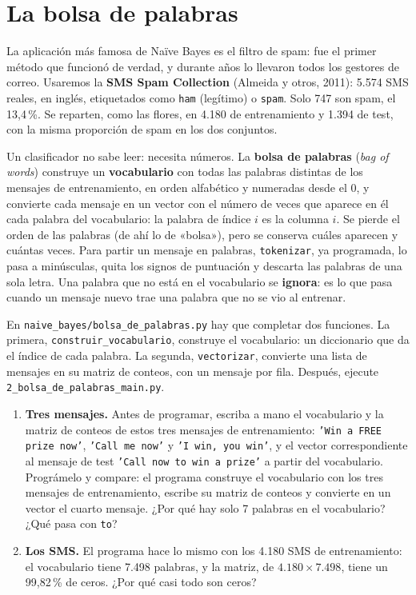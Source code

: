 \documentclass{article}
\begin{document}
\section{La bolsa de palabras}
La aplicación más famosa de Naïve Bayes es el filtro de spam: fue el primer método que funcionó de verdad, y durante años lo llevaron todos los gestores de correo. Usaremos la \textbf{SMS Spam Collection} (Almeida y otros, 2011): 5.574 SMS reales, en inglés, etiquetados como \texttt{ham} (legítimo) o \texttt{spam}. Solo 747 son spam, el 13,4\,\%. Se reparten, como las flores, en 4.180 de entrenamiento y 1.394 de test, con la misma proporción de spam en los dos conjuntos.

Un clasificador no sabe leer: necesita números. La \textbf{bolsa de palabras} (\textit{bag of words}) construye un \textbf{vocabulario} con todas las palabras distintas de los mensajes de entrenamiento, en orden alfabético y numeradas desde el 0, y convierte cada mensaje en un vector con el número de veces que aparece en él cada palabra del vocabulario: la palabra de índice $i$ es la columna $i$. Se pierde el orden de las palabras (de ahí lo de «bolsa»), pero se conserva cuáles aparecen y cuántas veces. Para partir un mensaje en palabras, \texttt{tokenizar}, ya programada, lo pasa a minúsculas, quita los signos de puntuación y descarta las palabras de una sola letra. Una palabra que no está en el vocabulario se \textbf{ignora}: es lo que pasa cuando un mensaje nuevo trae una palabra que no se vio al entrenar.

\begin{exercise}[breakable]\label{ej:bolsa}
En \texttt{naive\_bayes/bolsa\_de\_palabras.py} hay que completar dos funciones. La primera, \texttt{construir\_vocabulario}, construye el vocabulario: un diccionario que da el índice de cada palabra. La segunda, \texttt{vectorizar}, convierte una lista de mensajes en su matriz de conteos, con un mensaje por fila. Después, ejecute \texttt{2\_bolsa\_de\_palabras\_main.py}.
\begin{enumerate}
    \item[a)] \textbf{Tres mensajes.} Antes de programar, escriba a mano el vocabulario y la matriz de conteos de estos tres mensajes de entrenamiento: \texttt{'Win a FREE prize now'}, \texttt{'Call me now'} y \texttt{'I win, you win'}, y el vector correspondiente al mensaje de test \texttt{'Call now to win a prize'} a partir del vocabulario. Prográmelo y compare: el programa construye el vocabulario con los tres mensajes de entrenamiento, escribe su matriz de conteos y convierte en un vector el cuarto mensaje. ¿Por qué hay solo 7 palabras en el vocabulario? ¿Qué pasa con \texttt{to}?
    \item[b)] \textbf{Los SMS.} El programa hace lo mismo con los 4.180 SMS de entrenamiento: el vocabulario tiene 7.498 palabras, y la matriz, de $4.180 \times 7.498$, tiene un 99,82\,\% de ceros. ¿Por qué casi todo son ceros? 
\end{enumerate}
\end{exercise}
\end{document}
